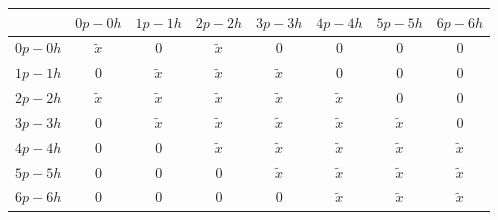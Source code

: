 \begin{table}[h]
  \begin{center}
  \begin{tabular}{cccccccc}
  \hline \multicolumn{1}{c}{ } & \multicolumn{1}{c}{ $0p-0h$ } &
  \multicolumn{1}{c}{ $1p-1h$ } & \multicolumn{1}{c}{ $2p-2h$ } &
  \multicolumn{1}{c}{ $3p-3h$ } & \multicolumn{1}{c}{ $4p-4h$ } &
  \multicolumn{1}{c}{ $5p-5h$ } & \multicolumn{1}{c}{ $6p-6h$ }
  \\ \hline $0p-0h$ & $\tilde{x}$ & 0 & $\tilde{x}$ & 0 & 0 & 0 & 0
  \\ $1p-1h$ & 0 & $\tilde{x}$ & $\tilde{x}$ & $\tilde{x}$ & 0 & 0 & 0
  \\ $2p-2h$ & $\tilde{x}$ & $\tilde{x}$ & $\tilde{x}$ & $\tilde{x}$ &
  $\tilde{x}$ & 0 & 0 \\ $3p-3h$ & 0 & $\tilde{x}$ & $\tilde{x}$ &
  $\tilde{x}$ & $\tilde{x}$ & $\tilde{x}$ & 0 \\ $4p-4h$ & 0 & 0 &
  $\tilde{x}$ & $\tilde{x}$ & $\tilde{x}$ & $\tilde{x}$ & $\tilde{x}$
  \\ $5p-5h$ & 0 & 0 & 0 & $\tilde{x}$ & $\tilde{x}$ & $\tilde{x}$ &
  $\tilde{x}$ \\ $6p-6h$ & 0 & 0 & 0 & 0 & $\tilde{x}$ & $\tilde{x}$ &
  $\tilde{x}$ \\ \hline
  \end{tabular}
  \end{center}
  \end{table}


